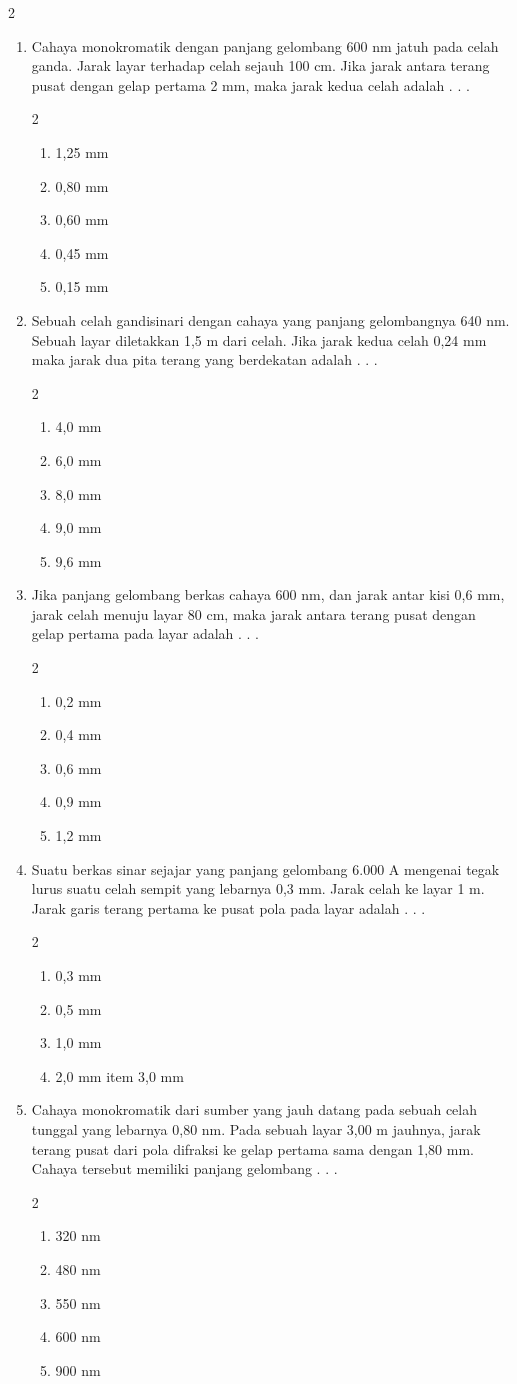 \documentclass[10pt,a4paper]{extarticle}
\newcommand{\pilgani}[1]{                            \vspace{-0.3cm}\begin{multicols}{2}
 \begin{enumerate}[label=\Alph*., itemsep=0pt,topsep=0pt,leftmargin=*,align=Center]#1                     \end{enumerate}
 \phantom{ini cuma sapi, wedus, dan ayam}
 \end{multicols}}
\begin{document}
\begin{multicols*}{2}
\begin{enumerate}
\item Cahaya monokromatik dengan panjang gelombang 600 nm jatuh pada celah ganda. Jarak layar
terhadap celah sejauh 100 cm. Jika jarak antara terang pusat dengan gelap pertama 2 mm, maka jarak kedua celah adalah . . .
\pilgani{
\item 1,25 mm
\item 0,80 mm
\item 0,60 mm
\item 0,45 mm
\item 0,15 mm }
\vspace{4.2cm}

\item Sebuah celah gandisinari dengan cahaya yang panjang gelombangnya 640 nm. Sebuah layar
diletakkan 1,5 m dari celah. Jika jarak kedua celah 0,24 mm maka jarak dua pita terang yang berdekatan adalah . . .
\pilgani{
\item 4,0 mm
\item 6,0 mm
\item 8,0 mm
\item 9,0 mm
\item 9,6 mm
}
\vspace{4.2cm}

\item Jika panjang gelombang berkas cahaya 600 nm, dan jarak antar
kisi 0,6 mm, jarak celah menuju layar 80 cm, maka jarak antara terang pusat dengan gelap pertama pada layar adalah . . .
\pilgani{
\item 0,2 mm
\item 0,4 mm
\item 0,6 mm
\item 0,9 mm
\item 1,2 mm
}
\vspace{ 3cm}

\item Suatu berkas sinar sejajar yang panjang gelombang 6.000 A mengenai tegak lurus suatu
celah sempit yang lebarnya 0,3 mm. Jarak celah ke layar 1 m. Jarak garis terang pertama ke
pusat pola pada layar adalah . . .
\pilgani{
\item 0,3 mm
\item 0,5 mm
\item 1,0 mm
\item 2,0 mm
item 3,0 mm
} \vspace{4.2cm}


\item  Cahaya monokromatik dari sumber yang jauh datang pada sebuah celah tunggal yang lebarnya
0,80 nm. Pada sebuah layar 3,00 m jauhnya, jarak terang pusat dari pola difraksi ke gelap
pertama sama dengan 1,80 mm. Cahaya tersebut memiliki panjang gelombang . . . 
\pilgani{
\item 320 nm
\item 480 nm
\item 550 nm
\item 600 nm
\item 900 nm
}
\vspace{4.2cm}


\end{enumerate}
\end{multicols*}
\end{document}
